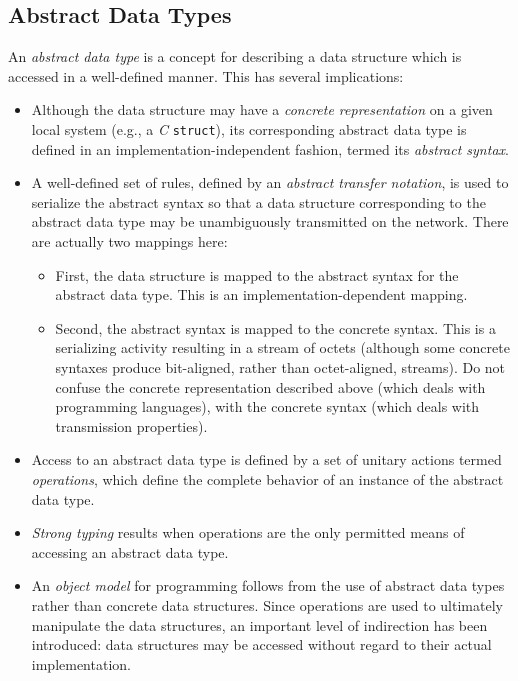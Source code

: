 \subsection	{Abstract Data Types}
An {\em abstract data type\/} is a concept for describing a data structure
which is accessed in a well-defined manner.
This has several implications:
\begin{itemize}
\item	Although the data structure may have a {\em concrete representation\/}
	on a given local system (e.g., a {\em C\/} \verb"struct"),
	its corresponding abstract data type is defined in an
	implementation-independent fashion,
	termed its {\em abstract syntax}.

\item	A well-defined set of rules,
	defined by an {\em abstract transfer notation},
	is used to serialize the abstract syntax so that a data structure
	corresponding to the abstract data type may be unambiguously
	transmitted on the network.
	There are actually two mappings here:
	\begin{itemize}
	\item	First, the data structure is mapped to the abstract syntax
		for the abstract data type.
		This is an implementation-dependent mapping.

	\item	Second, the abstract syntax is mapped to the concrete
		syntax.
		This is a serializing activity resulting in a stream of octets
		(although some concrete syntaxes produce bit-aligned,
		rather than octet-aligned, streams).
		Do not confuse the concrete representation described above
		(which deals with programming languages), with the concrete
		syntax (which deals with transmission properties).
	\end{itemize}

\item	Access to an abstract data type is defined by a set of unitary actions
	termed {\em operations},
	which define the complete behavior of an instance of the abstract data
	type.

\item	{\em Strong typing\/} results when operations are the only permitted
	means of accessing an abstract data type.

\item	An {\em object model\/} for programming follows from the use of
	abstract data types rather than concrete data structures.
	Since operations are used to ultimately manipulate the data structures,
	an important level of indirection has been introduced:
	data structures may be accessed without regard to their actual
	implementation.
\end{itemize}

